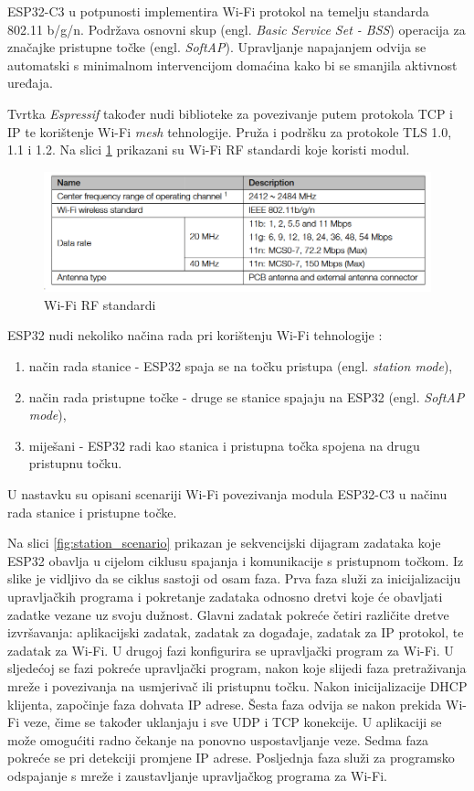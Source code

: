 ESP32-C3 u potpunosti implementira Wi-Fi protokol na temelju standarda 802.11 b/g/n. Podržava osnovni skup (engl. \textit{Basic Service Set - BSS}) operacija za značajke pristupne točke (engl. \textit{SoftAP}). Upravljanje napajanjem odvija se automatski s minimalnom intervencijom domaćina kako bi se smanjila aktivnost uređaja.

Tvrtka \textit{Espressif} također nudi biblioteke za povezivanje putem protokola TCP i IP te korištenje Wi-Fi \textit{mesh} tehnologije. Pruža i podršku za protokole TLS 1.0, 1.1 i 1.2. Na slici \ref{fig:wifi_rf_table} prikazani su Wi-Fi RF standardi koje koristi modul. 

\begin{figure}[ht]
	\centering
	\includegraphics[scale=0.5]{imgs/wifi_rf_table}
	\caption{Wi-Fi RF standardi \cite{esp_mini}}
	\label{fig:wifi_rf_table}
\end{figure}

ESP32 nudi nekoliko načina rada pri korištenju Wi-Fi tehnologije \cite{esp_wifi_connect_overview}:
\begin{enumerate}
	\item način rada stanice - ESP32 spaja se na točku pristupa (engl. \textit{station mode}),
	\item način rada pristupne točke - druge se stanice spajaju na ESP32 (engl. \textit{SoftAP mode}),
	\item miješani - ESP32 radi kao stanica i pristupna točka spojena na drugu pristupnu točku. 
\end{enumerate}

U nastavku su opisani scenariji Wi-Fi povezivanja modula ESP32-C3 u načinu rada stanice i pristupne točke.

Na slici \ref{fig:station_scenario} prikazan je sekvencijski dijagram zadataka koje ESP32 obavlja u cijelom ciklusu spajanja i komunikacije s pristupnom točkom. Iz slike je vidljivo da se ciklus sastoji od osam faza. Prva faza služi za inicijalizaciju upravljačkih programa i pokretanje zadataka odnosno dretvi koje će obavljati zadatke vezane uz svoju dužnost. Glavni zadatak pokreće četiri različite dretve izvršavanja: aplikacijski zadatak, zadatak za događaje, zadatak za IP protokol, te zadatak za Wi-Fi. U drugoj fazi konfigurira se upravljački program za Wi-Fi. U sljedećoj se fazi pokreće upravljački program, nakon koje slijedi faza pretraživanja mreže i povezivanja na usmjerivač ili pristupnu točku. Nakon inicijalizacije DHCP klijenta, započinje faza dohvata IP adrese. Šesta faza odvija se nakon prekida Wi-Fi veze, čime se također uklanjaju i sve UDP i TCP konekcije. U aplikaciji se može omogućiti radno čekanje na ponovno uspostavljanje veze. Sedma faza pokreće se pri detekciji promjene IP adrese. Posljednja faza služi za programsko odspajanje s mreže i zaustavljanje upravljačkog programa za Wi-Fi.

